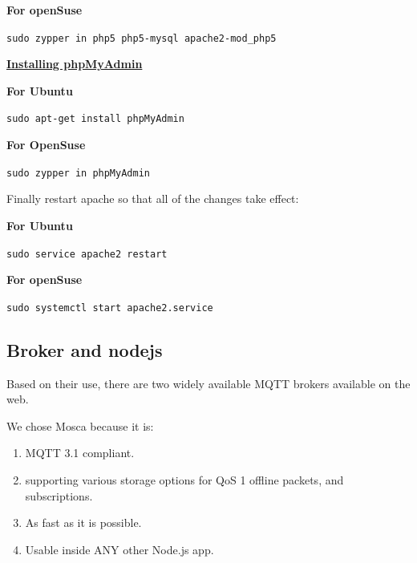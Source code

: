 \documentclass[16pt]{article}
\begin{document}
  \textbf{For openSuse}

  \texttt{sudo zypper in php5 php5-mysql apache2-mod\_php5}
  
   \vspace{0.5cm}

  {\underline{\textbf{Installing phpMyAdmin}}}

  \textbf{For Ubuntu}

  \texttt{sudo apt-get install phpMyAdmin}

  \textbf{For OpenSuse}

  \texttt{sudo zypper in phpMyAdmin}
   \vspace{0.5cm}

  Finally restart apache so that all of the changes take effect:

  \textbf{For Ubuntu}

  \texttt{sudo service apache2 restart}

  \textbf{For openSuse}

  \texttt{sudo systemctl start apache2.service}
   \vspace{0.5cm}

 

  

\subsection{Broker and nodejs}

 \vspace{0.5cm}

Based on their use, there are two widely available MQTT brokers
available on the web.
\begin{enumerate}
{} 
{}
\end{enumerate}
We chose Mosca because it is: 

\begin{enumerate}

\item MQTT 3.1 compliant.
\item supporting various storage options for QoS 1 offline packets, and subscriptions.
\item As fast as it is possible.
\item Usable inside ANY other Node.js app.

\end{enumerate}
 \vspace{0.5cm}
\end{document}
